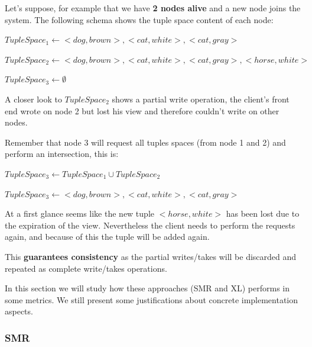 \documentclass[times, 10pt,twocolumn]{article}
\begin{document}
Let's suppose, for example that we have \textbf{2 nodes alive} and a new node joins the system.
The following schema shows the tuple space content of each node:

$ TupleSpace_{1} \leftarrow <dog, brown>, <cat, white>, <cat, gray> $

$ TupleSpace_{2} \leftarrow <dog, brown>, <cat, white>, <cat, gray>, <horse, white> $

$ TupleSpace_{3} \leftarrow \emptyset $

A closer look to $TupleSpace_{2}$ shows a partial write operation, 
the client's front end wrote on node 2 but lost his view and therefore couldn't write on other nodes.

Remember that node 3 will request all tuples spaces (from node 1 and 2) and perform an intersection, this is:

$ TupleSpace_{3} \leftarrow TupleSpace_{1} \cup TupleSpace_{2} $

$ TupleSpace_{3} \leftarrow <dog, brown>, <cat, white>, <cat, gray>$

At a first glance seems like the new tuple $<horse, white>$ has been lost due 
to the expiration of the view. Nevertheless the client needs to perform the 
requests again, and because of this the tuple will be added again.

This \textbf{guarantees consistency} as the partial writes/takes will be discarded
and repeated as complete write/takes operations.


In this section we will study how these approaches (SMR and XL) performs in some metrics.
We still present some justifications about concrete implementation aspects.

\subsubsection{SMR}

\end{document}
